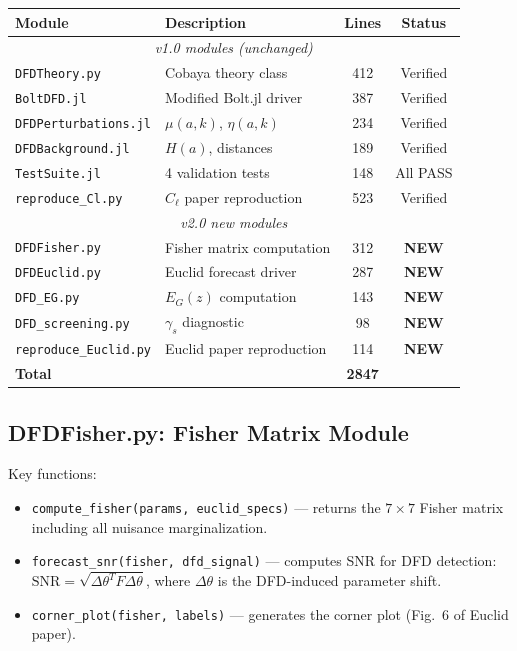 \documentclass[11pt,a4paper]{article}
\begin{document}
\begin{center}
\begin{tabular}{llcc}
\toprule
\textbf{Module} & \textbf{Description} & \textbf{Lines} & \textbf{Status} \\
\midrule
\multicolumn{4}{c}{\textit{v1.0 modules (unchanged)}} \\
\midrule
\texttt{DFDTheory.py} & Cobaya theory class & 412 & Verified \\
\texttt{BoltDFD.jl} & Modified Bolt.jl driver & 387 & Verified \\
\texttt{DFDPerturbations.jl} & $\mu(a,k)$, $\eta(a,k)$ & 234 & Verified \\
\texttt{DFDBackground.jl} & $H(a)$, distances & 189 & Verified \\
\texttt{TestSuite.jl} & 4 validation tests & 148 & All PASS \\
\texttt{reproduce\_Cl.py} & $C_\ell$ paper reproduction & 523 & Verified \\
\midrule
\multicolumn{4}{c}{\textit{v2.0 new modules}} \\
\midrule
\texttt{DFDFisher.py} & Fisher matrix computation & 312 & \textbf{NEW} \\
\texttt{DFDEuclid.py} & Euclid forecast driver & 287 & \textbf{NEW} \\
\texttt{DFD\_EG.py} & $E_G(z)$ computation & 143 & \textbf{NEW} \\
\texttt{DFD\_screening.py} & $\gamma_s$ diagnostic & 98 & \textbf{NEW} \\
\texttt{reproduce\_Euclid.py} & Euclid paper reproduction & 114 & \textbf{NEW} \\
\midrule
\textbf{Total} & & \textbf{2847} & \\
\bottomrule
\end{tabular}
\end{center}

\subsection{DFDFisher.py: Fisher Matrix Module}

Key functions:
\begin{itemize}
\item \texttt{compute\_fisher(params, euclid\_specs)} --- returns the $7 \times 7$ Fisher matrix including all nuisance marginalization.
\item \texttt{forecast\_snr(fisher, dfd\_signal)} --- computes SNR for DFD detection: $\mathrm{SNR} = \sqrt{\Delta\theta^T F \Delta\theta}$, where $\Delta\theta$ is the DFD-induced parameter shift.
\item \texttt{corner\_plot(fisher, labels)} --- generates the corner plot (Fig.~6 of Euclid paper).
\end{itemize}
\end{document}
